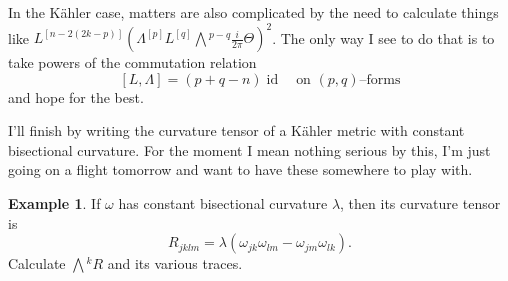 \documentclass[11pt,a4paper]{amsart}
\def\^#1{^{[#1]}}
\DeclareMathOperator{\id}{id}
\def\skrun{\frac{i}{2\pi} \Theta}
\def\bw#1{\bigwedge{}^{\! #1}}
\theoremstyle{definition}
\newtheorem{exam}[theo]{Example}
\numberwithin{equation}{section}
\begin{document}
In the K\"{a}hler case, matters are also complicated by the need to
calculate things like $L\^{n-2(2k-p)}(\Lambda\^p L\^{q} \bw{p-q}\skrun)^2$.
The only way I see to do that is to take powers of the commutation relation
$$
[L, \Lambda] = (p + q - n) \id
\quad\text{on $(p,q)$--forms}
$$
and hope for the best.

I'll finish by writing the curvature tensor of a K\"{a}hler metric with
constant bisectional curvature. For the moment I mean nothing serious by
this, I'm just going on a flight tomorrow and want to have these somewhere
to play with.


\begin{exam}
If $\omega$ has constant bisectional curvature $\lambda$, then its
curvature tensor is 
$$
R_{jklm} = \lambda(\omega_{jk} \omega_{lm} - \omega_{jm} \omega_{lk}).
$$ 
Calculate $\bw{k}R$ and its various traces.
\end{exam}





\end{document}
